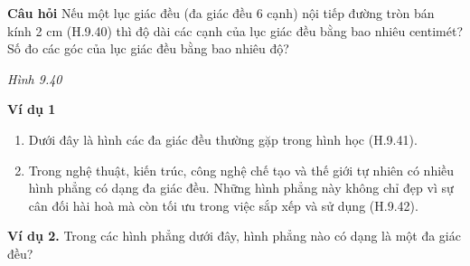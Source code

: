 \begin{lesson}
    \textbf{Câu hỏi} Nếu một lục giác đều (đa giác đều 6 cạnh) nội tiếp đường tròn bán kính 2 cm (H.9.40) thì độ dài các cạnh của lục giác đều bằng bao nhiêu centimét? Số đo các góc của lục giác đều bằng bao nhiêu độ?

    \begin{center}

        \textit{Hình 9.40}
    \end{center}

    \answerline
    \answerline

    \textbf{Ví dụ 1}
    \begin{enumerate}[label=\alph*)]
        \item Dưới đây là hình các đa giác đều thường gặp trong hình học (H.9.41).

        \item Trong nghệ thuật, kiến trúc, công nghệ chế tạo và thế giới tự nhiên có nhiều hình phẳng có dạng đa giác đều. Những hình phẳng này không chỉ đẹp vì sự cân đối hài hoà mà còn tối ưu trong việc sắp xếp và sử dụng (H.9.42).

    \end{enumerate}

    \textbf{Ví dụ 2.} Trong các hình phẳng dưới đây, hình phẳng nào có dạng là một đa giác đều?



\end{lesson}
